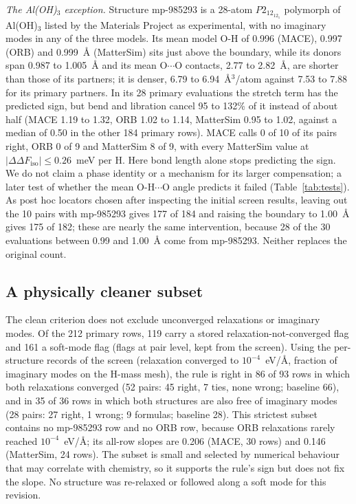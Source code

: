 \documentclass[aps,prmaterials,reprint,superscriptaddress,nofootinbib]{revtex4-2}
\newcommand{\ddF}{\Delta\Delta F_{\mathrm{iso}}}
\begin{document}
\textit{The Al(OH)$_3$ exception.} Structure mp-985293 is a 28-atom $P2_12_12_1$ polymorph of Al(OH)$_3$ listed by the Materials Project as experimental, with no imaginary modes in any of the three models. Its mean model O-H of 0.996 (MACE), 0.997 (ORB) and 0.999~\AA{} (MatterSim) sits just above the boundary, while its donors span 0.987 to 1.005~\AA{} and its mean O$\cdots$O contacts, 2.77 to 2.82~\AA, are shorter than those of its partners; it is denser, 6.79 to 6.94~\AA$^3$/atom against 7.53 to 7.88 for its primary partners. In its 28 primary evaluations the stretch term has the predicted sign, but bend and libration cancel 95 to 132\% of it instead of about half (MACE 1.19 to 1.32, ORB 1.02 to 1.14, MatterSim 0.95 to 1.02, against a median of 0.50 in the other 184 primary rows). MACE calls 0 of 10 of its pairs right, ORB 0 of 9 and MatterSim 8 of 9, with every MatterSim value at $|\ddF|\leq0.26$~meV per H. Here bond length alone stops predicting the sign. We do not claim a phase identity or a mechanism for its larger compensation; a later test of whether the mean O-H$\cdots$O angle predicts it failed (Table~\ref{tab:tests}). As post hoc locators chosen after inspecting the initial screen results, leaving out the 10 pairs with mp-985293 gives 177 of 184 and raising the boundary to 1.00~\AA{} gives 175 of 182; these are nearly the same intervention, because 28 of the 30 evaluations between 0.99 and 1.00~\AA{} come from mp-985293. Neither replaces the original count.

\subsection{A physically cleaner subset}
\label{sec:physclean}

The clean criterion does not exclude unconverged relaxations or imaginary modes. Of the 212 primary rows, 119 carry a stored relaxation-not-converged flag and 161 a soft-mode flag (flags at pair level, kept from the screen). Using the per-structure records of the screen (relaxation converged to $10^{-4}$~eV/\AA, fraction of imaginary modes on the H-mass mesh), the rule is right in 86 of 93 rows in which both relaxations converged (52 pairs: 45 right, 7 ties, none wrong; baseline 66), and in 35 of 36 rows in which both structures are also free of imaginary modes (28 pairs: 27 right, 1 wrong; 9 formulas; baseline 28). This strictest subset contains no mp-985293 row and no ORB row, because ORB relaxations rarely reached $10^{-4}$~eV/\AA; its all-row slopes are 0.206 (MACE, 30 rows) and 0.146 (MatterSim, 24 rows). The subset is small and selected by numerical behaviour that may correlate with chemistry, so it supports the rule's sign but does not fix the slope. No structure was re-relaxed or followed along a soft mode for this revision.
\end{document}
